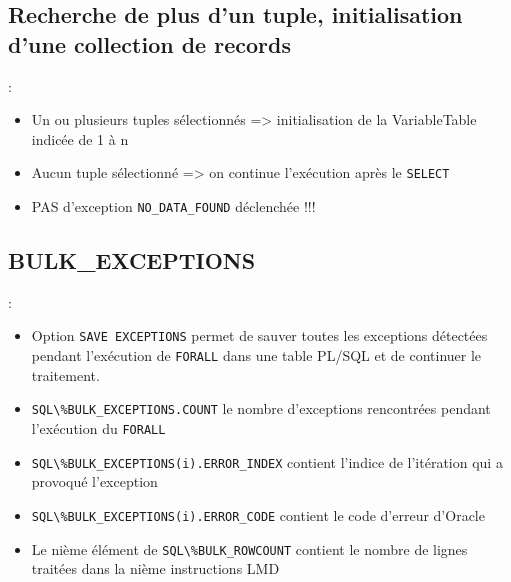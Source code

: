 \documentclass[10pt]{beamer}
\begin{document}
\subsection{Recherche de plus d'un tuple, initialisation d'une collection de records}
\begin{frame}{\secname : \subsecname}
    
\begin{itemize}
    \item Un ou plusieurs tuples sélectionnés => initialisation de la VariableTable indicée de 1 à n
    \item Aucun tuple sélectionné => on continue l'exécution après le \lstinline[language=plsql]!SELECT!
    \item PAS d'exception \lstinline[language=plsql]!NO_DATA_FOUND! déclenchée !!!
\end{itemize}
\end{frame}

\subsection{BULK\_EXCEPTIONS}
\begin{frame}{\secname : \subsecname}
\begin{itemize}
    \item Option \lstinline[language=plsql]!SAVE EXCEPTIONS! permet de sauver toutes les exceptions détectées pendant l’exécution de \lstinline[language=plsql]!FORALL! dans une table PL/SQL et de continuer le traitement.
    \item \lstinline[language=plsql]!SQL\%BULK_EXCEPTIONS.COUNT! le nombre d’exceptions rencontrées pendant l’exécution du \lstinline[language=plsql]!FORALL!
    \item \lstinline[language=plsql]!SQL\%BULK_EXCEPTIONS(i).ERROR_INDEX! contient l’indice de l’itération qui a provoqué l’exception
    \item \lstinline[language=plsql]!SQL\%BULK_EXCEPTIONS(i).ERROR_CODE! contient le code d’erreur d’Oracle
    \item Le nième élément de \lstinline[language=plsql]!SQL\%BULK_ROWCOUNT! contient le nombre de lignes traitées dans la nième instructions LMD
\end{itemize}
\end{frame}
\end{document}
